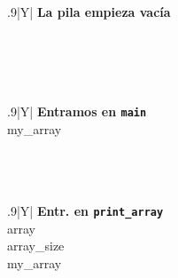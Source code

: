 \documentclass[a4paper]{article}
\begin{document}
\begin{table}[H]
\centering
    \begin{subfigure}{0.33333\linewidth}
        \centering
        \begin{tabularx}{.9\linewidth}{|Y|}
        \hline
        \textbf{La pila empieza vacía}\\\hline
         \\\hline
        \\ \hline
        \\ \hline
        \\ \hline
        \end{tabularx}
    \end{subfigure}%
    \begin{subfigure}{0.33333\linewidth}
        \centering
        \begin{tabularx}{.9\linewidth}{|Y|}
        \hline
        \textbf{Entramos en \texttt{main}}\\\hline
        my\_array\\\hline
        \\ \hline
        \\ \hline
        \\ \hline
        \end{tabularx}
    \end{subfigure}%
    \begin{subfigure}{0.33333\linewidth}
        \centering
        \begin{tabularx}{.9\linewidth}{|Y|}
        \hline
        \textbf{Entr. en \texttt{print\_array}}\\\hline
        array\\\hline
        array\_size\\\hline
        my\_array\\\hline
        \\ \hline
        \end{tabularx}
    \end{subfigure}%



\end{table}
\end{document}
